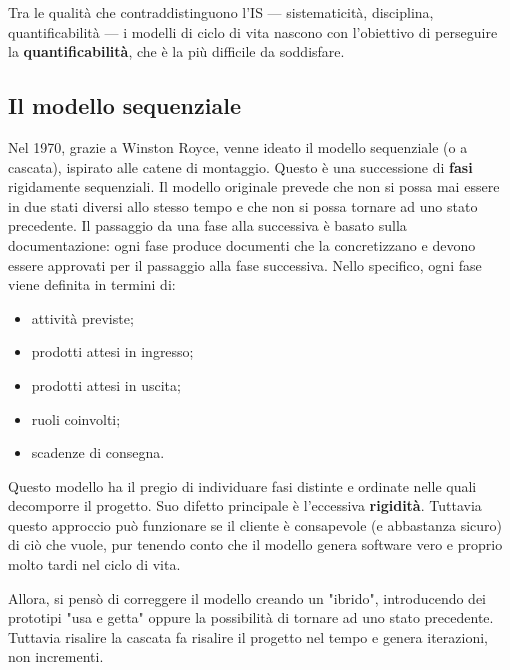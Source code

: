 \documentclass[a4paper]{article}
\begin{document}
Tra le qualità che contraddistinguono l'IS --- sistematicità, disciplina, quantificabilità --- i modelli di ciclo di vita nascono con l'obiettivo di perseguire la \textbf{quantificabilità}, che è la più difficile da soddisfare.

		
	\subsection{Il modello sequenziale}

		
Nel 1970, grazie a Winston Royce, venne ideato il modello sequenziale (o a cascata), ispirato alle catene di montaggio. Questo è una successione di \textbf{fasi} rigidamente sequenziali. Il modello originale prevede che non si possa mai essere in due stati diversi allo stesso tempo e che non si possa tornare ad uno stato precedente. Il passaggio da una fase alla successiva è basato sulla documentazione: ogni fase produce documenti che la concretizzano e devono essere approvati per il passaggio alla fase successiva. Nello specifico, ogni fase viene definita in termini di:
		
	\begin{itemize}
		
			
	\item attività previste;
			
	\item prodotti attesi in ingresso;
			
	\item prodotti attesi in uscita;
			
	\item ruoli coinvolti;
			
	\item scadenze di consegna.
		
	\end{itemize}

		
Questo modello ha il pregio di individuare fasi distinte e ordinate nelle quali decomporre il progetto. Suo difetto principale è l'eccessiva \textbf{rigidità}. Tuttavia questo approccio può funzionare se il cliente è consapevole (e abbastanza sicuro) di ciò che vuole, pur tenendo conto che il modello genera software vero e proprio molto tardi nel ciclo di vita.
		
Allora, si pensò di correggere il modello creando un "ibrido", introducendo dei prototipi "usa e getta" oppure la possibilità di tornare ad uno stato precedente. Tuttavia risalire la cascata fa risalire il progetto nel tempo e genera iterazioni, non incrementi.
\end{document}
